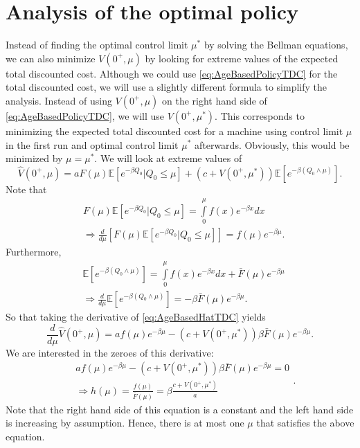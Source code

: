 \section{Analysis of the optimal policy}\label{section:AgeBasedOptimalPolicy}
Instead of finding the optimal control limit $\mu^*$ by solving the Bellman equations, we can also minimize $V(0^+,\mu)$ by looking for extreme values of the expected total discounted cost.
Although we could use \eqref{eq:AgeBasedPolicyTDC} for the total discounted cost, we will use a slightly different formula to simplify the analysis.
Instead of using $V(0^+,\mu)$ on the right hand side of \eqref{eq:AgeBasedPolicyTDC}, we will use $V(0^+,\mu^*)$.
This corresponds to minimizing the expected total discounted cost for a machine using control limit $\mu$ in the first run and optimal control limit $\mu^*$ afterwards.
Obviously, this would be minimized by $\mu=\mu^*$.
We will look at extreme values of
\begin{equation}\label{eq:AgeBasedHatTDC}
\hat{V}(0^+,\mu)=aF(\mu)\mathbb{E}[e^{-\beta Q_0}|Q_0\leq \mu]+(c+V(0^+,\mu^*))\mathbb{E}[e^{-\beta(Q_0\wedge\mu)}].
\end{equation}
Note that 
\[
\begin{split}
&F(\mu)\mathbb{E}[e^{-\beta Q_0}|Q_0\leq \mu]=\int\limits_0^\mu f(x)e^{-\beta x}dx\\
&\Rightarrow \frac{d}{d\mu}\left[F(\mu)\mathbb{E}[e^{-\beta Q_0}|Q_0\leq \mu]\right]=f(\mu)e^{-\beta \mu}.
\end{split}
\]
Furthermore,
\[
\begin{split}
&\mathbb{E}[e^{-\beta(Q_0\wedge\mu)}]=\int\limits_0^\mu f(x)e^{-\beta x}dx+\bar{F}(\mu)e^{-\beta\mu}\\
&\Rightarrow \frac{d}{d\mu}\mathbb{E}[e^{-\beta(Q_0\wedge\mu)}]=-\beta\bar{F}(\mu)e^{-\beta\mu}.
\end{split}
\]
So that taking the derivative of \eqref{eq:AgeBasedHatTDC} yields
\[\frac{d}{d\mu}\hat{V}(0^+,\mu)=af(\mu)e^{-\beta\mu}-(c+V(0^+,\mu^*))\beta\bar{F}(\mu)e^{-\beta\mu}.\]
We are interested in the zeroes of this derivative:
\[
\begin{split}
&af(\mu)e^{-\beta\mu}-(c+V(0^+,\mu^*))\beta\bar{F}(\mu)e^{-\beta\mu}=0\\
&\Rightarrow h(\mu)=\frac{f(\mu)}{\bar{F}(\mu)}=\beta\frac{c+V(0^+,\mu^*)}{a}
\end{split}
.\]
Note that the right hand side of this equation is a constant and the left hand side is increasing by assumption.
Hence, there is at most one $\mu$ that satisfies the above equation.
